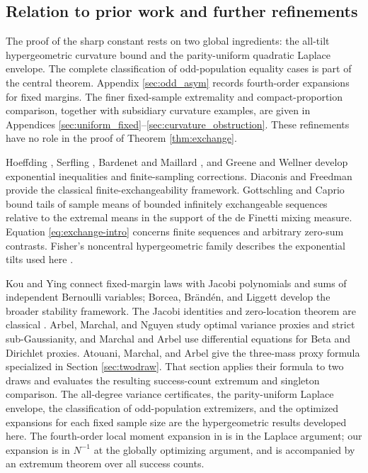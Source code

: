 \documentclass[11pt,a4paper]{article}
\begin{document}
\subsection{Relation to prior work and further refinements}
The proof of the sharp constant rests on two global ingredients: the all-tilt hypergeometric curvature bound and the parity-uniform quadratic Laplace envelope. The complete classification of odd-population equality cases is part of the central theorem. Appendix \ref{sec:odd_asym} records fourth-order expansions for fixed margins. The finer fixed-sample extremality and compact-proportion comparison, together with subsidiary curvature examples, are given in Appendices \ref{sec:uniform_fixed}--\ref{sec:curvature_obstruction}. These refinements have no role in the proof of Theorem \ref{thm:exchange}.

Hoeffding \cite{Hoeffding}, Serfling \cite{Serfling}, Bardenet and Maillard \cite{BardenetMaillard}, and Greene and Wellner \cite{GreeneWellner} develop exponential inequalities and finite-sampling corrections. Diaconis and Freedman \cite{DiaconisFreedman} provide the classical finite-exchangeability framework. Gottschling and Caprio \cite{GottschlingCaprio} bound tails of sample means of bounded infinitely exchangeable sequences relative to the extremal means in the support of the de Finetti mixing measure. Equation \eqref{eq:exchange-intro} concerns finite sequences and arbitrary zero-sum contrasts. Fisher's noncentral hypergeometric family describes the exponential tilts used here \cite{Fog}.

Kou and Ying \cite{Kou} connect fixed-margin laws with Jacobi polynomials and sums of independent Bernoulli variables; Borcea, Br\"and\'en, and Liggett \cite{BBL} develop the broader stability framework. The Jacobi identities and zero-location theorem are classical \cite[Chapter IV and Section 6.7]{Szego}. Arbel, Marchal, and Nguyen \cite{ArbelMarchalNguyen} study optimal variance proxies and strict sub-Gaussianity, and Marchal and Arbel \cite{MarchalArbel} use differential equations for Beta and Dirichlet proxies. Atouani, Marchal, and Arbel \cite[Theorem 3.2 and Corollary 3.3]{AtouaniMarchalArbel} give the three-mass proxy formula specialized in Section \ref{sec:twodraw}. That section applies their formula to two draws and evaluates the resulting success-count extremum and singleton comparison. The all-degree variance certificates, the parity-uniform Laplace envelope, the classification of odd-population extremizers, and the optimized expansions for each fixed sample size are the hypergeometric results developed here. The fourth-order local moment expansion in \cite[Remark 3.6]{AtouaniMarchalArbel} is in the Laplace argument; our expansion is in $N^{-1}$ at the globally optimizing argument, and is accompanied by an extremum theorem over all success counts.
\end{document}
